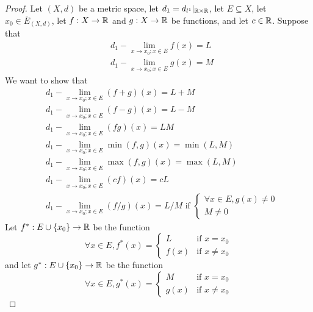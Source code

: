 \begin{proof}
  Let \((X, d)\) be a metric space, let \(d_1 = d_{l^1}|_{\mathbb{R} \times \mathbb{R}}\), let \(E \subseteq X\), let \(x_0 \in \overline{E}_{(X, d)}\), let \(f : X \to \mathbb{R}\) and \(g : X \to \mathbb{R}\) be functions, and let \(c \in \mathbb{R}\).
  Suppose that
  \begin{align*}
     & d_1 - \lim_{x \to x_0 ; x \in E} f(x) = L \\
     & d_1 - \lim_{x \to x_0 ; x \in E} g(x) = M
  \end{align*}
  We want to show that
  \begin{align*}
     & d_1 - \lim_{x \to x_0 ; x \in E} (f + g)(x) = L + M                                          \\
     & d_1 - \lim_{x \to x_0 ; x \in E} (f - g)(x) = L - M                                          \\
     & d_1 - \lim_{x \to x_0 ; x \in E} (fg)(x) = LM                                                \\
     & d_1 - \lim_{x \to x_0 ; x \in E} \min(f, g)(x) = \min(L, M)                                  \\
     & d_1 - \lim_{x \to x_0 ; x \in E} \max(f, g)(x) = \max(L, M)                                  \\
     & d_1 - \lim_{x \to x_0 ; x \in E} (cf)(x) = cL                                                \\
     & d_1 - \lim_{x \to x_0 ; x \in E} (f / g)(x) = L / M \text{ if } \begin{cases}
                                                                         \forall x \in E, g(x) \neq 0 \\
                                                                         M \neq 0
                                                                       \end{cases}
  \end{align*}
  Let \(f^* : E \cup \{x_0\} \to \mathbb{R}\) be the function
  \[
    \forall x \in E, f^*(x) = \begin{cases}
      L    & \text{if } x = x_0    \\
      f(x) & \text{if } x \neq x_0
    \end{cases}
  \]
  and let \(g^* : E \cup \{x_0\} \to \mathbb{R}\) be the function
  \[
    \forall x \in E, g^*(x) = \begin{cases}
      M    & \text{if } x = x_0    \\
      g(x) & \text{if } x \neq x_0
    \end{cases}
\]
\end{proof}
